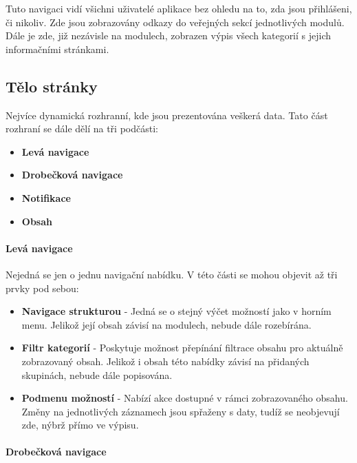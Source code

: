 \documentclass[11pt,oneside]{fithesis}
\begin{document}
            Tuto navigaci vidí všichni uživatelé aplikace bez ohledu na to, zda jsou přihlášeni, či nikoliv.
            Zde jsou zobrazovány odkazy do veřejných sekcí jednotlivých modulů. Dále je zde, již nezávisle na modulech, zobrazen výpis všech kategorií s jejich informačními stránkami.

        \subsection{Tělo stránky}
            Nejvíce dynamická rozhranní, kde jsou prezentována veškerá data. Tato část rozhraní se dále dělí na tři podčásti:
            \begin{itemize}
                \item \textbf{Levá navigace}
                \item \textbf{Drobečková navigace}
                \item \textbf{Notifikace}
                \item \textbf{Obsah}
            \end{itemize}

            \paragraph*{Levá navigace}

            Nejedná se jen o jednu navigační nabídku. V této části se mohou objevit až tři prvky pod sebou:
            \begin{itemize}
                \item \textbf{Navigace strukturou} - Jedná se o stejný výčet možností jako v horním menu. Jelikož její obsah závisí na  modulech, nebude dále rozebírána.
                \item \textbf{Filtr kategorií} - Poskytuje možnost přepínání filtrace obsahu pro aktuálně zobrazovaný obsah. Jelikož i obsah této nabídky závisí na přidaných skupinách, nebude dále popisována.
                \item \textbf{Podmenu možností} - Nabízí akce dostupné v rámci zobrazovaného obsahu. Změny na jednotlivých záznamech jsou spřaženy s daty, tudíž se neobjevují zde, nýbrž přímo ve výpisu.
            \end{itemize}
            
            \paragraph*{Drobečková navigace}
\end{document}
